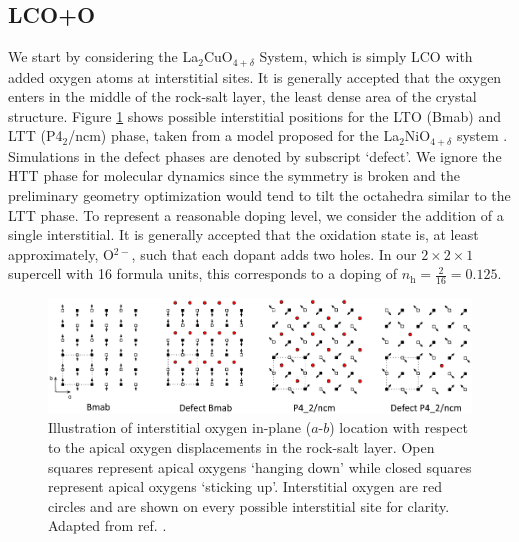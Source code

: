 \subsection{LCO+O}
We start by considering the La$_2$CuO$_{4+\delta}$ System, which is simply LCO with added oxygen atoms at interstitial sites. It is generally accepted that the oxygen enters in the middle of the rock-salt layer, the least dense area of the crystal structure. Figure \ref{fig:oint_location} shows possible interstitial positions for the LTO (Bmab) and LTT (P4$_2$/ncm) phase, taken from a model proposed for the La$_2$NiO$_{4+\delta}$ system \cite{Tranquada1994}. Simulations in the defect phases are denoted by subscript `defect'. We ignore the HTT phase for molecular dynamics since the symmetry is broken and the preliminary geometry optimization would tend to tilt the octahedra similar to the LTT phase. To represent a reasonable doping level, we consider the addition of a single interstitial. It is generally accepted that the oxidation state is, at least approximately, O$^{2-}$, such that each dopant adds two holes. In our $2 \times 2 \times 1$ supercell with 16 formula units, this corresponds to a doping of $n_\text{h} = \frac{2}{16} = 0.125$.

\begin{figure}
    \centering
    \includegraphics[width=\textwidth]{fig/md/oint.png}
    \caption[Illustration of interstitial positions]{Illustration of interstitial oxygen in-plane ($a$-$b$) location with respect to the apical oxygen displacements in the rock-salt layer. Open squares represent apical oxygens `hanging down' while closed squares represent apical oxygens `sticking up'. Interstitial oxygen are red circles and are shown on every possible interstitial site for clarity. Adapted from ref. \cite{Tranquada1994}.}
    \label{fig:oint_location}
\end{figure}

